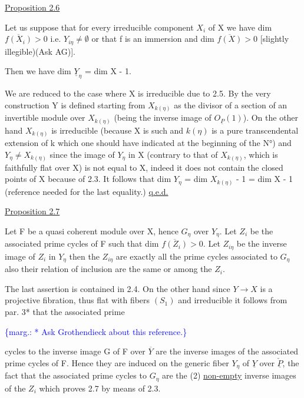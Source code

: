 \documentclass[11pt]{article}
\newcommand{\scanpage}[1]{\par\bigskip\noindent{\small\sffamily[scan #1]}\par}
\newcommand{\mspage}[1]{{\small\sffamily[p.\,#1]}}
\newcommand{\margin}[1]{\textcolor{blue}{\{\textsf{marg.:} #1\}}}
\newcommand{\uline}[1]{\underline{#1}}
\begin{document}
\uline{Proposition 2.6}

Let us suppose that for every irreducible component $X_i$ of X
we have dim $\overline{f(X_i)} > 0$ i.e. $Y_{i\eta} \neq \emptyset$ or that f is an immersion and
dim $\overline{f(X)} > 0$ [slightly illegible)(Ask AG)].

Then we have dim $\underline{Y}_\eta$ = dim X - 1.

We are reduced to the case where X is irreducible due to 2.5.
By the very construction Y is defined starting from $X_{k(\eta)}$ as the
divisor of a section of an invertible module over $X_{k(\eta)}$ (being the
inverse image of $O_{\underline{P}}(1)$).  On the other hand $X_{k(\eta)}$ is irreducible
(because X is such and $k(\eta)$ is a pure transcendental extension of
k which one should have indicated at the beginning of the N°) and
$Y_\eta \neq X_{k(\eta)}$ since the image of $Y_\eta$ in X (contrary to that of $X_{k(\eta)}$,
which is faithfully flat over X) is not equal to X, indeed it does
not contain the closed points of X because of 2.3.  It follows
that dim $Y_\eta$ = dim $X_{k(\eta)}$ - 1 = dim X - 1 (reference needed for the
last equality.) \uline{q.e.d.}

\uline{Proposition 2.7}

Let F be a quasi coherent module over X, hence $G_\eta$ over $Y_\eta$.
Let $Z_i$ be the associated prime cycles of F such that dim $\overline{f(Z_i)} > 0$.
Let $Z_{i\eta}$ be the inverse image of $Z_i$ in $Y_\eta$ then the $Z_{i\eta}$ are exactly
all the prime cycles associated to $G_\eta$ also their relation of
inclusion are the same or among the $Z_i$.

The last assertion is contained in 2.4.  On the other hand
since $Y \to X$ is a projective fibration, thus flat with fibers $(S_1)$
and irreducible it follows from par. 3* that the associated prime

\margin{* Ask Grothendieck about this reference.}

\clearpage
\scanpage{24/13}
\mspage{13}

cycles to the inverse image G of F over $\overline{Y}$ are the inverse images
of the associated prime cycles of F.  Hence they are induced on
the generic fiber $Y_{\eta}$ of $\underline{Y}$ over $\check{\underline{P}}$, the fact that the associated
prime cycles to $G_{\eta}$ are the (2) \uline{non-empty} inverse images of the $Z_{i}$
which proves 2.7 by means of 2.3.
\end{document}
